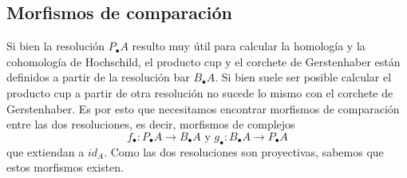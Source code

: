 \documentclass[fleqn,../tesis.tex]{subfiles}
\begin{document}
\subsection{Morfismos de comparación}
Si bien la resolución $P_{\bullet}A$ resulto muy útil para calcular la homología y la cohomología de Hochschild,
el producto cup y el corchete de Gerstenhaber están definidos a partir de la resolución bar $B_{\bullet}A$.
Si bien suele ser posible calcular el producto cup a partir de otra resolución no sucede lo mismo
con el corchete de Gerstenhaber.
Es por esto que necesitamos encontrar morfismos de comparación entre las dos resoluciones, es decir, morfismos
de complejos
\[
	f_{\bullet} : P_{\bullet}A \to B_{\bullet}A \text{ y } g_{\bullet} : B_{\bullet}A \to P_{\bullet}A
\]
que extiendan a $id_A$. Como las dos resoluciones son proyectivas, sabemos que estos morfismos existen.
\end{document}
